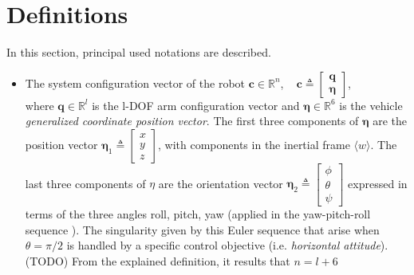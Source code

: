 \section{Definitions}
\label{sec:definitions}
In this section, principal used notations are described.
\begin{itemize}
	\item The system configuration vector of the robot $ \boldsymbol{c} \in \mathbb{R}^{n}$, ~
	$\boldsymbol{c} \triangleq 
		\begin{bmatrix}
			{\boldsymbol{q}} \\ \boldsymbol{\eta}
		\end{bmatrix}$,\\
	where $\boldsymbol{q} \in \mathbb{R}^{l}$ is the l-DOF arm configuration vector and  $\boldsymbol{\eta} \in \mathbb{R}^6$ is the vehicle \emph{generalized coordinate position vector}. The first three components of $\boldsymbol{\eta}$ are the position vector $\boldsymbol{\eta}_1 \triangleq \begin{bmatrix}x \\ y \\ z\end{bmatrix}$, with components in the inertial frame $\langle w \rangle$. The last three components of $\eta$ are the orientation vector $\boldsymbol{\eta}_2 \triangleq \begin{bmatrix}\phi \\ \theta \\ \psi\end{bmatrix}$ expressed in terms of the three angles roll, pitch, yaw (applied in the yaw-pitch-roll sequence \cite{fossenAnglesSeq}). The singularity given by this Euler sequence that arise when $ \theta = \pi/2$ is handled by a specific control objective (i.e. \textit{horizontal attitude}).
	(TODO) %
	From the explained definition, it results that $ n = l+6 $
	

\end{itemize}

